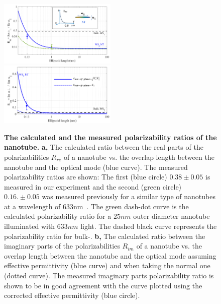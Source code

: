 \documentclass[journal=jacsat,manuscript=article]{achemso}
\begin{document}
\begin{figure}[H]
\centering
   \includegraphics[width=0.5\textwidth]{Images/Rre_semilog_NT91A.png}\\
   \includegraphics[width=0.5\textwidth]{Images/Rim_semilog_NT6_a1.png}
   \caption{\textbf{The calculated and the measured polarizability ratios of the  nanotube.} \textbf{a,} The calculated ratio between the real parts of the polarizabilities $R_{re}$ of a  nanotube vs. the overlap length between the nanotube and the optical mode (blue curve). The measured polarizability ratios are shown: The first (blue circle) $0.38 \pm 0.05$ is measured in our experiment and the second (green circle) $0.16.\pm0.05$ was measured previously for a similar type of nanotubes at a wavelength of 633nm~\cite{tenne2005orientation}. The green dash-dot curve is the calculated polarizability ratio for a $25nm$ outer diameter nanotube illuminated with $633nm$ light. The dashed black curve represents the polarizability ratio for bulk-. \textbf{b,} The calculated ratio between the imaginary parts of the polarizabilities $R_{im}$ of a  nanotube vs. the overlap length between the nanotube and the optical mode assuming effective permittivity (blue curve) and when taking the normal one (dotted curve). The measured imaginary parts polarizability ratio is shown to be in good agreement with the curve plotted using the corrected effective permittivity (blue circle).}
\label{fig:pol_ratios}
\end{figure}
\end{document}
